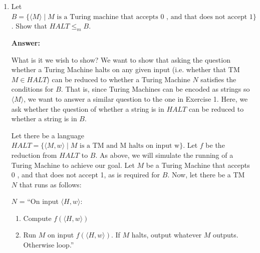 \documentclass[11pt]{article}
\begin{document}
\begin{enumerate}[label=\textbf{Exercise \arabic{*}}]
        Since $N$ runs $M$ on $f(w)$ and outputs whatever it outputs, $N$ accepts iff $M$ accepts, and it rejects or loops when $M$ does, namely iff $w \not\in A$.

        Why does this show that if $B$ is Turing-recognizable, then $A$ is Turing-recognizable as well? Because the question we are posing about $A$ can be transformed by a computable function (in this case $f$), which is a finite sequence of steps, i.e.\ an algorithm, into a question about $B$. We are using this function to transform the question ``is $w \in A$?'' into the question ``is $f(w) \in B$?'' We have $M$, a recognizer for $B$, and we wrap that Turing Machine in another that performs the very steps we just described as needed: transform the input of the question about $A$ into the corresponding question about $B$, and then use the answer to question about $B$ to answer the question about $A$.


  \item Let $B =\{\langle M \rangle \mid \textrm{$M$ is a Turing machine that accepts 0 , and that does  not accept 1}\}$. Show that $HALT \le_m B$.
        \medskip

        \textbf{Answer:}

        What is it we wish to show? We want to show that asking the question whether a Turing Machine halts on any given input (i.e. whether that TM $M \in HALT$) can be reduced to whether a Turing Machine $N$ satisfies the conditions for $B$. That is, since Turing Machines can be encoded as strings so $\langle M \rangle$, we want to answer a similar question to the one in Exercise 1. Here, we ask whether the question of whether a string is in $HALT$ can be reduced to whether a string is in $B$.

        Let there be a language $HALT = \{\langle M, w \rangle \mid \textrm{$M$ is a TM and M halts on input w}\}$. Let $f$ be the reduction from $HALT$ to $B$. As above, we will simulate the running of a Turing Machine to achieve our goal. Let $M$ be a Turing Machine that accepts 0 , and that does not accept 1, as is required for $B$. Now, let there be a TM $N$ that runs as follows:

        $N$ = ``On input $\langle H, w \rangle$:
        \begin{enumerate}
          \item Compute $f(\langle H, w \rangle)$
          \item Run $M$ on input $f(\langle H, w \rangle)$. If $M$ halts, output whatever $M$ outputs. Otherwise loop.''
        \end{enumerate}


\end{enumerate}
\end{document}

